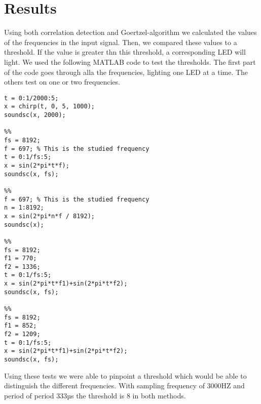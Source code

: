 \section{Results}
Using both correlation detection and Goertzel-algorithm we calculated the values of the frequencies in the input signal. Then, we compared these values to a threshold. If the value is greater thn this threshold, a corresponding LED will light. We used the following MATLAB code to test the thresholds. The first part of the code goes through alla the frequencies, lighting one LED at a time. The others test on one or two frequencies.

\begin{lstlisting}
t = 0:1/2000:5;
x = chirp(t, 0, 5, 1000);
soundsc(x, 2000);

%%
fs = 8192;
f = 697; % This is the studied frequency
t = 0:1/fs:5;
x = sin(2*pi*t*f);
soundsc(x, fs);

%%
f = 697; % This is the studied frequency
n = 1:8192;
x = sin(2*pi*n*f / 8192);
soundsc(x);

%%
fs = 8192;
f1 = 770;
f2 = 1336;
t = 0:1/fs:5;
x = sin(2*pi*t*f1)+sin(2*pi*t*f2);
soundsc(x, fs);

%%
fs = 8192;
f1 = 852;
f2 = 1209;
t = 0:1/fs:5;
x = sin(2*pi*t*f1)+sin(2*pi*t*f2);
soundsc(x, fs);
\end{lstlisting}

Using these tests we were able to pinpoint a threshold which would be able to distinguish the different frequencies. With sampling frequency of 3000HZ and period of period 333µs the threshold is 8 in both methods.